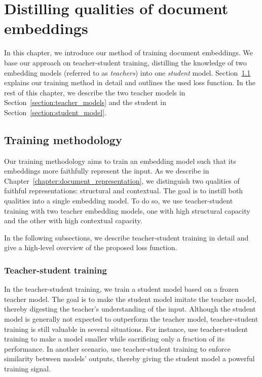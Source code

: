\chapter{Distilling qualities of document
embeddings}\label{chapter:training_method}

In this chapter, we introduce our method of training document embeddings. We
base our approach on teacher-student training, distilling the knowledge of two
embedding models (referred to as \emph{teachers}) into one  \emph{student}
model. Section~\ref{section:training_method} explains our training method in
detail and outlines the used loss function. In the rest of this chapter, we
describe the two teacher models in Section~\ref{section:teacher_models} and the
student in Section~\ref{section:student_model}.

\section{Training methodology}\label{section:training_method}

Our training methodology aims to train an embedding model such that its
embeddings more faithfully represent the input. As we describe in
Chapter~\ref{chapter:document_representation}, we distinguish two qualities of
faithful representations: structural and contextual. The goal is to instill
both qualities into a single embedding model. To do so, we use teacher-student
training with two teacher embedding models, one with high structural capacity
and the other with high contextual capacity.

In the following subsections, we describe teacher-student training in detail
and give a high-level overview of the proposed loss function.

\subsection{Teacher-student training}

In the teacher-student training, we train a student model based on a frozen
teacher model. The goal is to make the student model imitate the teacher model,
thereby digesting the teacher's understanding of the input. Although the
student model is generally not expected to outperform the teacher model,
teacher-student training is still valuable in several situations. For instance,
\cite{sanh2019distilbert} use teacher-student training to make a model smaller
while sacrificing only a fraction of its performance. In another scenario,
\cite{reimers2020making} use teacher-student training to enforce similarity
between models' outputs, thereby giving the student model a powerful training
signal.

